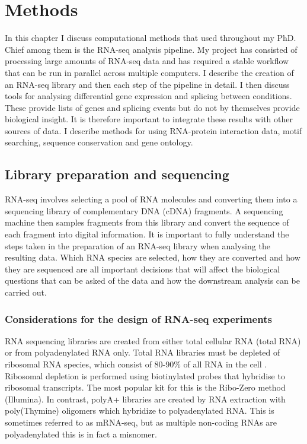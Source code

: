 
\chapter{Methods}
\label{chapter:methods}

In this chapter I discuss computational methods that used throughout my PhD. 
Chief among them is the RNA-seq analysis pipeline. 
My project has consisted of processing large amounts of RNA-seq data and has required a stable workflow that can be run in parallel across multiple computers.
I describe the creation of an RNA-seq library and then each step of the pipeline in detail. 
I then discuss tools for analysing differential gene expression and splicing between conditions.
These provide lists of genes and splicing events but do not by themselves provide biological insight.
It is therefore important to integrate these results with other sources of data.
I describe methods for using RNA-protein interaction data, motif searching, sequence conservation and gene ontology.

\section{Library preparation and sequencing}

RNA-seq involves selecting a pool of RNA molecules and converting them into a sequencing library of complementary DNA (cDNA) fragments. A sequencing machine then samples fragments from this library and convert the sequence of each fragment into digital information. 
It is important to fully understand the steps taken in the preparation of an RNA-seq library when analysing the resulting data. 
Which RNA species are selected, how they are converted and how they are sequenced are all important decisions that will affect the biological questions that can be asked of the data and how the downstream analysis can be carried out.

\subsection{Considerations for the design of RNA-seq experiments}

RNA sequencing libraries are created from either total cellular RNA (total RNA) or from polyadenylated RNA only.
Total RNA libraries must be depleted of ribosomal RNA species, which consist of 80-90\% of all RNA in the cell \citep{Wilhelm2009}. 
Ribosomal depletion is performed using biotinylated probes that hybridise to ribosomal transcripts. The most popular kit for this is the Ribo-Zero method (Illumina).
In contrast, polyA+ libraries are created  by RNA extraction with poly(Thymine) oligomers which  hybridize to polyadenylated RNA. 
This is sometimes referred to as mRNA-seq, but as multiple non-coding RNAs are polyadenylated this is in fact a misnomer.

